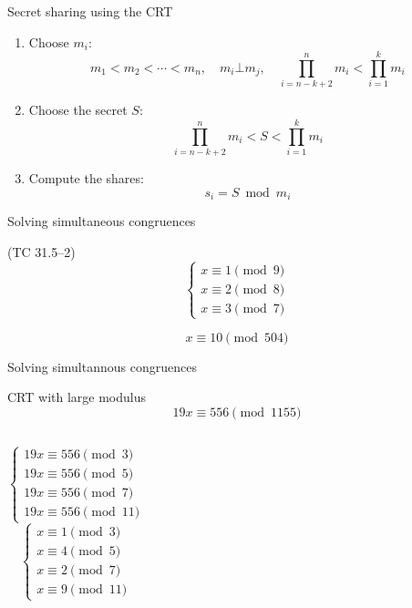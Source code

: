 \begin{frame}{Secret sharing using the CRT}
  \begin{enumerate}[<+->]
	\item Choose $m_i$:
	  \[
		m_1 < m_2 < \cdots < m_n, \quad m_i \bot m_j, \quad \prod_{i=n-k+2}^{n} m_i < \prod_{i=1}^{k} m_i
	  \]
	\item Choose the secret $S$:
	  \[
		\prod_{i=n-k+2}^{n} m_i < S < \prod_{i=1}^{k} m_i
	  \]
	\item Compute the shares:
	  \[
		s_i = S \bmod m_i
	  \]
  \end{enumerate}
\end{frame}
\begin{frame}{Solving simultaneous congruences}
  \begin{exampleblock}{(TC 31.5--2)}
	\[
	  \begin{cases}
		x \equiv 1 \pmod{9} \\
		x \equiv 2 \pmod{8} \\
		x \equiv 3 \pmod{7}
	  \end{cases}
	\]
  \end{exampleblock}

  \pause
  \[
	x \equiv 10 \pmod{504}
  \]
\end{frame}
\begin{frame}{Solving simultannous congruences}
  \begin{exampleblock}{CRT with large modulus}
	\[
	  19x \equiv 556 \pmod{1155}
	\]
  \end{exampleblock}

  \begin{columns}
	  \pause
	  \[
		\begin{cases}
		  19x \equiv 556 \pmod{3} \\
		  19x \equiv 556 \pmod{5} \\
		  19x \equiv 556 \pmod{7} \\
		  19x \equiv 556 \pmod{11}
		\end{cases}
	  \]
	  \pause
	  \[
		\begin{cases}
		  x \equiv 1 \pmod{3} \\
		  x \equiv 4 \pmod{5} \\
		  x \equiv 2 \pmod{7} \\
		  x \equiv 9 \pmod{11}
		\end{cases}
	  \]
  \end{columns}
\end{frame}
